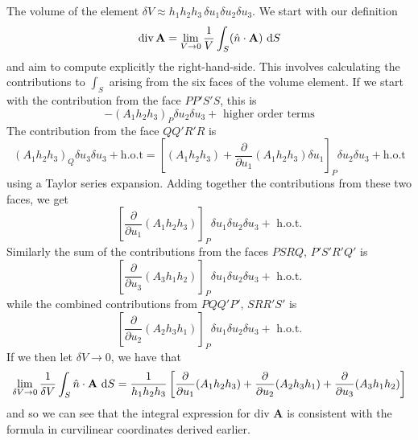 The volume of the element $\delta V \approx h_1h_2h_3\,\delta u_1\delta u_2\delta u_3$. We start with our definition
\[
  \mathrm{div}\,\mathbf A = \lim_{V \to 0}\dfrac{1}{V}\int_S (\hat n \cdot \mathbf A)\,\d S
\]
and aim to compute explicitly the right-hand-side. 
This involves calculating the contributions to $\int_S$ arising from the six faces of the volume element. 
If we start with the contribution from the face 
$PP'S'S$, this is 
\[
  -(A_1h_2h_3)_P \delta u_2\delta u_3 + \text{ higher order terms}
\]
The contribution from the face $QQ'R'R$ is
\[
  (A_1h_2h_3)_Q\delta u_3\delta u_3 + \text{h.o.t} = \left[(A_1h_2h_3) + \dfrac{\partial }{\partial u_1}(A_1h_2h_3)\delta u_1\right]_P \delta u_2\delta u_3 + \text{h.o.t}
\]
using a Taylor series expansion.  Adding together the contributions from these two faces, we get 
\[
  \left[\dfrac{\partial }{\partial u_1}(A_1h_2h_3)\right]_P \delta u_1\delta u_2\delta u_3 + \text{ h.o.t.}
\]
Similarly the sum of the contributions from the faces $PSRQ,\, P'S'R'Q'$ is 
\[
  \left[\dfrac{\partial }{\partial u_3}(A_3h_1h_2)\right]_P\delta u_1\delta u_2\delta u_3 + \text{ h.o.t.}
\]
while the combined contributions from $PQQ'P',\, SRR'S'$ is 
\[
  \left[\dfrac{\partial }{\partial u_2}(A_2h_3h_1)\right]_P\delta u_1\delta u_2\delta u_3 + \text{ h.o.t.}
\]
If we then let $\delta V \to 0$, we have that
\[
  \lim_{\delta V \to 0}\dfrac{1}{\delta V}\int_S \hat n \cdot \mathbf A\, \d S
  = \dfrac{1}{h_1h_2h_3}\left[\dfrac{\partial }{\partial u_1}(A_1h_2h_3) + \dfrac{\partial }{\partial u_2}(A_2h_3h_1) + \dfrac{\partial }{\partial u_3}(A_3h_1h_2)\right]
\]
and so we can see that the integral expression for div $\mathbf A$ is consistent with the formula
in curvilinear coordinates derived earlier.


